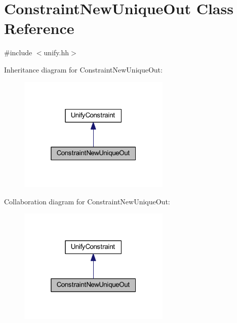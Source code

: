 \hypertarget{class_constraint_new_unique_out}{}\section{Constraint\+New\+Unique\+Out Class Reference}
\label{class_constraint_new_unique_out}


{\ttfamily \#include $<$unify.\+hh$>$}



Inheritance diagram for Constraint\+New\+Unique\+Out\+:
\nopagebreak
\begin{figure}[H]
\begin{center}
\leavevmode
\includegraphics[width=205pt]{class_constraint_new_unique_out__inherit__graph}
\end{center}
\end{figure}


Collaboration diagram for Constraint\+New\+Unique\+Out\+:
\nopagebreak
\begin{figure}[H]
\begin{center}
\leavevmode
\includegraphics[width=205pt]{class_constraint_new_unique_out__coll__graph}
\end{center}
\end{figure}
